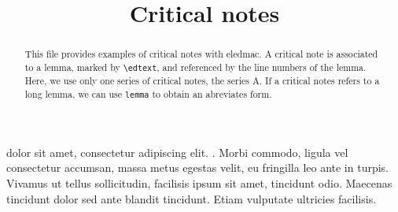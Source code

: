 \documentclass{article}
\begin{document}
\begin{english}
\title{Critical notes}
\maketitle
\begin{abstract}
This file provides examples of critical notes with eledmac. 
A critical note is associated to a lemma, marked by \verb+\edtext+, and referenced by the line numbers of the lemma.
Here, we use only one series of critical notes, the series A. If a critical notes refers to a long lemma, we can use \verb+lemma+ to obtain an abreviates form.
\end{abstract}
\end{english}

\beginnumbering
\pstart
{}  dolor sit amet, consectetur adipiscing elit. . Morbi commodo, ligula vel consectetur accumsan, massa metus egestas velit, eu fringilla leo ante in turpis. Vivamus ut tellus sollicitudin, facilisis ipsum sit amet, tincidunt odio. Maecenas tincidunt dolor sed ante blandit tincidunt. Etiam vulputate ultricies facilisis.
\pend
\endnumbering
\end{document}
